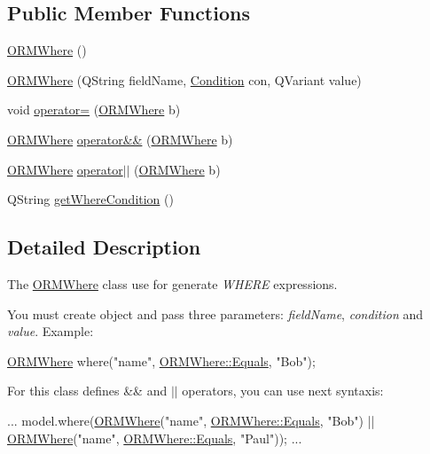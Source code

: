 \subsection*{Public Member Functions}
\begin{DoxyCompactItemize}
\item 
\hyperlink{class_o_r_m_where_acc5e93592334c096f7f2633485ed8c24}{O\-R\-M\-Where} ()
\item 
\hyperlink{class_o_r_m_where_aa4afa0f05076fb02dd6f0058c268e5a6}{O\-R\-M\-Where} (Q\-String field\-Name, \hyperlink{class_o_r_m_where_a187706d50dd5a95bdbffc6e41f617275}{Condition} con, Q\-Variant value)
\item 
void \hyperlink{class_o_r_m_where_a2322a4e6ecedc637a06f2904f4bedcc8}{operator=} (\hyperlink{class_o_r_m_where}{O\-R\-M\-Where} b)
\item 
\hyperlink{class_o_r_m_where}{O\-R\-M\-Where} \hyperlink{class_o_r_m_where_a301acae1560447b35fbbf50375d5285c}{operator\&\&} (\hyperlink{class_o_r_m_where}{O\-R\-M\-Where} b)
\item 
\hyperlink{class_o_r_m_where}{O\-R\-M\-Where} \hyperlink{class_o_r_m_where_a5785105b73bbc8533c6b10fe07108402}{operator$|$$|$} (\hyperlink{class_o_r_m_where}{O\-R\-M\-Where} b)
\item 
Q\-String \hyperlink{class_o_r_m_where_ad235e31bfb0c824258b55da06b240ee5}{get\-Where\-Condition} ()
\end{DoxyCompactItemize}


\subsection{Detailed Description}
The \hyperlink{class_o_r_m_where}{O\-R\-M\-Where} class use for generate {\itshape W\-H\-E\-R\-E} expressions. 

You must create object and pass three parameters\-: {\itshape field\-Name}, {\itshape condition} and {\itshape value}. Example\-: 
\begin{DoxyCode}
\hyperlink{class_o_r_m_where}{ORMWhere} where(\textcolor{stringliteral}{"name"}, \hyperlink{class_o_r_m_where_a187706d50dd5a95bdbffc6e41f617275ae39fef7ec26a030eb0346ce6ab33e504}{ORMWhere::Equals}, \textcolor{stringliteral}{"Bob"});
\end{DoxyCode}
 For this class defines \&\& and $|$$|$ operators, you can use next syntaxis\-: 
\begin{DoxyCode}
...
model.where(\hyperlink{class_o_r_m_where_acc5e93592334c096f7f2633485ed8c24}{ORMWhere}(\textcolor{stringliteral}{"name"}, \hyperlink{class_o_r_m_where_a187706d50dd5a95bdbffc6e41f617275ae39fef7ec26a030eb0346ce6ab33e504}{ORMWhere::Equals}, \textcolor{stringliteral}{"Bob"}) 
      || \hyperlink{class_o_r_m_where_acc5e93592334c096f7f2633485ed8c24}{ORMWhere}(\textcolor{stringliteral}{"name"}, \hyperlink{class_o_r_m_where_a187706d50dd5a95bdbffc6e41f617275ae39fef7ec26a030eb0346ce6ab33e504}{ORMWhere::Equals}, \textcolor{stringliteral}{"Paul"}));
...
\end{DoxyCode}
 

